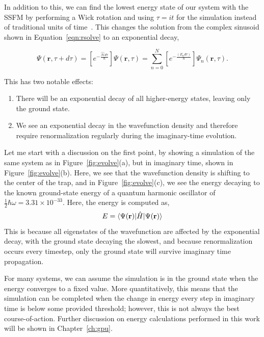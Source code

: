 In addition to this, we can find the lowest energy state of our system with the SSFM by performing a Wick rotation and using $\tau = it$ for the simulation instead of traditional units of time~\cite{wick1954}.
This changes the solution from the complex sinusoid shown in Equation~\eqref{eqn:rsolve} to an exponential decay,

\begin{equation}
\Psi(\mathbf{r},\tau + d\tau) = \left[e^{-\frac{\mathcal{\hat{H}}d\tau}{\hbar}}\right]\Psi(\mathbf{r},\tau) = \sum_{n=0}^N\left[e^{-\frac{(E_n d\tau)}{\hbar}}\right]\Psi_n(\mathbf{r},\tau).
\end{equation}

\noindent This has two notable effects:
\begin{enumerate}
\item There will be an exponential decay of all higher-energy states, leaving only the ground state.
\item We see an exponential decay in the wavefunction density and therefore require renormalization regularly during the imaginary-time evolution.
\end{enumerate}
Let me start with a discussion on the first point, by showing a simulation of the same system as in Figure~\ref{fig:evolve}(a), but in imaginary time, shown in Figure~\ref{fig:evolve}(b).
Here, we see that the wavefunction density is shifting to the center of the trap, and
in Figure~\ref{fig:evolve}(c), we see the energy decaying to the known ground-state energy of a quantum harmonic oscillator of $\frac{1}{2}\hbar\omega = 3.31\times 10^{-33}$.
Here, the energy is computed as,
\begin{equation}
E = \braket{\Psi(\mathbf{r})|\hat H|\Psi(\mathbf{r})}
\label{eqn:energy}
\end{equation}
This is because all eigenstates of the wavefunction are affected by the exponential decay, with the ground state decaying the slowest, and because renormalization occurs every timestep, only the ground state will survive imaginary time propagation.

For many systems, we can assume the simulation is in the ground state when the energy converges to a fixed value.
More quantitatively, this means that the simulation can be completed when the change in energy every step in imaginary time is below some provided threshold; however, this is not always the best course-of-action.
Further discussion on energy calculations performed in this work will be shown in Chapter~\ref{ch:gpu}.

